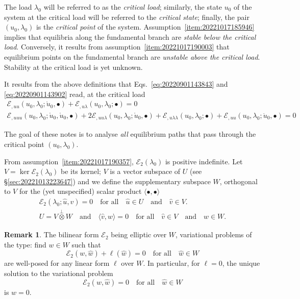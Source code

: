 \documentclass[12pt, final]{scrartcl}
\theoremstyle{definition}
\newtheorem{remark}{Remark}
\newcommand{\E}{\mathcal E}
\begin{document}
The load $\lambda_0$ will be referred to as the \emph{critical load}; similarly, the state $u_0$ of the system at the
critical load will be referred to the \emph{critical state}; finally, the pair $(u_0, \lambda_0)$ is the \emph{critical
  point} of the system. Assumption~\ref{item:20221017185946} implies that equilibria along the fundamental branch are
\emph{stable below the critical load}. Conversely, it results from assumption~\ref{item:20221017190003} that equilibrium
points on the fundamental branch are \emph{unstable above the critical load}. Stability at the critical load is yet
unknown.

It results from the above definitions that Eqs.~\eqref{eq:20220901143843} and \eqref{eq:20220901143902} read, at the
critical load
\begin{gather}
  \label{eq:20220901144331}
  \E_{,uu}(u_0, \lambda_0; \mathring{u}_0, \bullet) + \E_{,u\lambda}(u_0, \lambda_0; \bullet) = 0\\
  \label{eq:20220901144335}
  \E_{,uuu}(u_0, \lambda_0; \mathring{u}_0, \mathring{u}_0, \bullet) + 2\E_{,uu\lambda}(u_0, \lambda_0; \mathring{u}_0, \bullet) + \E_{,u\lambda\lambda}(u_0, \lambda_0; \bullet) + \E_{,uu}(u_0, \lambda_0; \ddot{u}_0, \bullet) = 0
\end{gather}

The goal of these notes is to analyse \emph{all} equilibrium paths that pass through the critical point
$(u_0, \lambda_0)$.

From assumption~\ref{item:20221017190357}, $\E_2(\lambda_0)$ is positive indefinite. Let $V = \ker \E_2(\lambda_0)$ be
its kernel; $V$ is a vector subspace of $U$ (see \S \ref{sec:20221013223647}) and we define the supplementary subspace
$W$, orthogonal to $V$ for the (yet unspecified) scalar product $\langle \bullet, \bullet \rangle$
\begin{gather}
  \E_2(\lambda_0; \hat{u}, \hat{v}) = 0 \quad \text{for all} \quad \hat{u} \in U \quad \text{and} \quad \hat{v} \in V.\\
  U = V \overset{\perp}{\otimes} W \quad \text{and} \quad \langle \hat{v}, \hat{w} \rangle = 0 \quad \text{for all} \quad \hat{v} \in V \quad \text{and} \quad \hat{w} \in W.
\end{gather}

\begin{remark}
  \label{rem:20220902095055}
  The bilinear form $\E_2$ being elliptic over $W$, variational problems of the type: find $w \in W$ such that
  \begin{equation}
    \E_2(w, \hat{w})+\ell(\hat{w}) = 0 \quad \text{for all} \quad \hat{w} \in W
  \end{equation}
  are well-posed for any linear form $\ell$ over $W$. In particular, for $\ell=0$, the unique solution to the
  variational problem
  \begin{equation}
    \E_2(w, \hat{w}) = 0 \quad \text{for all} \quad \hat{w} \in W
  \end{equation}
  is $w = 0$.
\end{remark}
\end{document}
